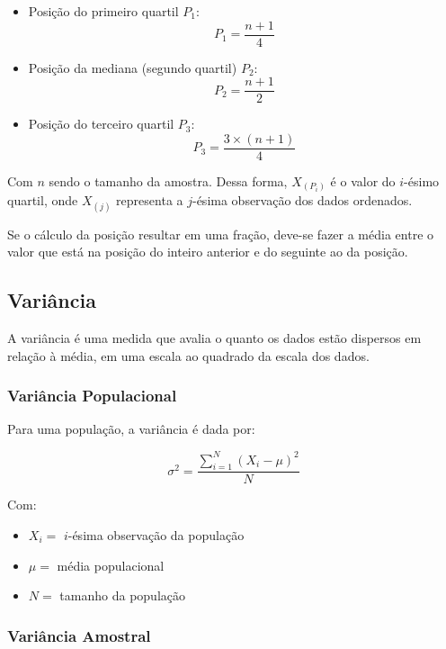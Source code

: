 \documentclass[
]{estat/estat}
\begin{document}
\begin{itemize}
\item
  Posição do primeiro quartil \(P_1\): \[P_1=\frac{n+1}{4}\]
\item
  Posição da mediana (segundo quartil) \(P_2\): \[P_2 = \frac{n+1}{2}\]
\item
  Posição do terceiro quartil \(P_3\): \[P_3=\frac{3 \times (n+1)}{4}\]
\end{itemize}

Com \(n\) sendo o tamanho da amostra. Dessa forma,
\(X_{\left( P_i \right)}\) é o valor do \(i\)-ésimo quartil, onde
\(X_{\left( j \right)}\) representa a \(j\)-ésima observação dos dados
ordenados.

Se o cálculo da posição resultar em uma fração, deve-se fazer a média
entre o valor que está na posição do inteiro anterior e do seguinte ao
da posição.

\hypertarget{variuxe2ncia}{%
\subsection{Variância}\label{variuxe2ncia}}

A variância é uma medida que avalia o quanto os dados estão dispersos em
relação à média, em uma escala ao quadrado da escala dos dados.

\hypertarget{variuxe2ncia-populacional}{%
\subsubsection{Variância Populacional}\label{variuxe2ncia-populacional}}

Para uma população, a variância é dada por:

\[\sigma^2=\frac{\sum\limits_{i=1}^{N}\left(X_i - \mu\right)^2}{N}\]

Com:

\begin{itemize}
\item
  \(X_i =\) \(i\)-ésima observação da população
\item
  \(\mu =\) média populacional
\item
  \(N =\) tamanho da população
\end{itemize}

\hypertarget{variuxe2ncia-amostral}{%
\subsubsection{Variância Amostral}\label{variuxe2ncia-amostral}}
\end{document}
